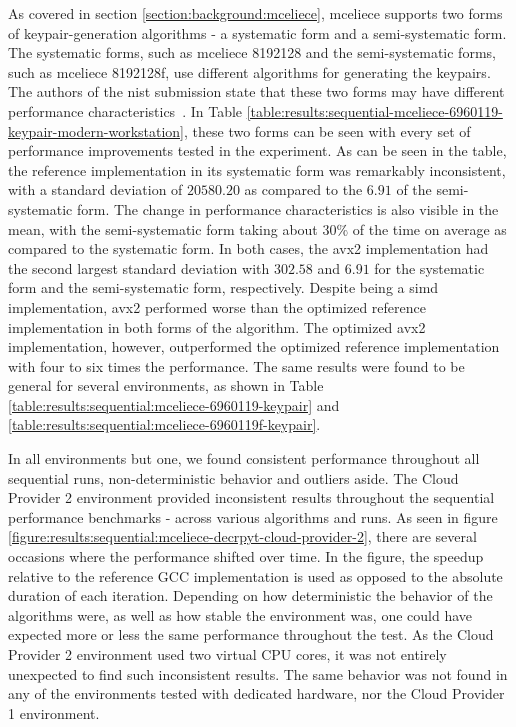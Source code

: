 As covered in section \ref{section:background:mceliece}, \gls{mceliece} supports two forms of keypair-generation algorithms - a systematic form and a semi-systematic form. The systematic forms, such as \gls{mceliece} 8192128 and the semi-systematic forms, such as \gls{mceliece} 8192128f, use different algorithms for generating the keypairs. The authors of the \gls{nist} submission state that these two forms may have different performance characteristics~\cite{mceliece2020}. In Table \ref{table:results:sequential-mceliece-6960119-keypair-modern-workstation}, these two forms can be seen with every set of performance improvements tested in the experiment. As can be seen in the table, the reference implementation in its systematic form was remarkably inconsistent, with a standard deviation of $20580.20$ as compared to the $6.91$ of the semi-systematic form. The change in performance characteristics is also visible in the mean, with the semi-systematic form taking about $30\%$ of the time on average as compared to the systematic form. In both cases, the \gls{avx2} implementation had the second largest standard deviation with $302.58$ and $6.91$ for the systematic form and the semi-systematic form, respectively. Despite being a \gls{simd} implementation, \gls{avx2} performed worse than the optimized reference implementation in both forms of the algorithm. The optimized \gls{avx2} implementation, however, outperformed the optimized reference implementation with four to six times the performance. The same results were found to be general for several environments, as shown in Table \ref{table:results:sequential:mceliece-6960119-keypair} and \ref{table:results:sequential:mceliece-6960119f-keypair}.



In all environments but one, we found consistent performance throughout all sequential runs, non-deterministic behavior and outliers aside. The Cloud Provider 2 environment provided inconsistent results throughout the sequential performance benchmarks - across various algorithms and runs. As seen in figure \ref{figure:results:sequential:mceliece-decrpyt-cloud-provider-2}, there are several occasions where the performance shifted over time. In the figure, the speedup relative to the reference GCC implementation is used as opposed to the absolute duration of each iteration. Depending on how deterministic the behavior of the algorithms were, as well as how stable the environment was, one could have expected more or less the same performance throughout the test. As the Cloud Provider 2 environment used two virtual CPU cores, it was not entirely unexpected to find such inconsistent results. The same behavior was not found in any of the environments tested with dedicated hardware, nor the Cloud Provider 1 environment.

